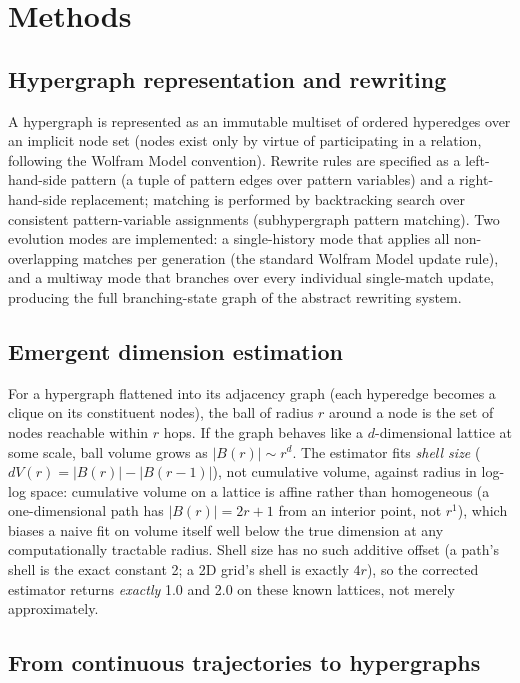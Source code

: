 \documentclass[11pt,a4paper]{article}
\begin{document}
\section{Methods}

\subsection{Hypergraph representation and rewriting}

A hypergraph is represented as an immutable multiset of ordered hyperedges
over an implicit node set (nodes exist only by virtue of participating in
a relation, following the Wolfram Model convention). Rewrite rules are
specified as a left-hand-side pattern (a tuple of pattern edges over
pattern variables) and a right-hand-side replacement; matching is
performed by backtracking search over consistent pattern-variable
assignments (subhypergraph pattern matching). Two evolution modes are
implemented: a single-history mode that applies all non-overlapping
matches per generation (the standard Wolfram Model update rule), and a
multiway mode that branches over every individual single-match update,
producing the full branching-state graph of the abstract rewriting system.

\subsection{Emergent dimension estimation}

For a hypergraph flattened into its adjacency graph (each hyperedge
becomes a clique on its constituent nodes), the ball of radius $r$ around
a node is the set of nodes reachable within $r$ hops. If the graph behaves
like a $d$-dimensional lattice at some scale, ball volume grows as
$|B(r)| \sim r^d$. The estimator fits \emph{shell size}
($dV(r) = |B(r)| - |B(r-1)|$), not cumulative volume, against radius in
log-log space: cumulative volume on a lattice is affine rather than
homogeneous (a one-dimensional path has $|B(r)| = 2r+1$ from an interior
point, not $r^1$), which biases a naive fit on volume itself well below
the true dimension at any computationally tractable radius. Shell size has
no such additive offset (a path's shell is the exact constant 2; a 2D
grid's shell is exactly $4r$), so the corrected estimator returns
\emph{exactly} 1.0 and 2.0 on these known lattices, not merely
approximately.

\subsection{From continuous trajectories to hypergraphs}
\end{document}
